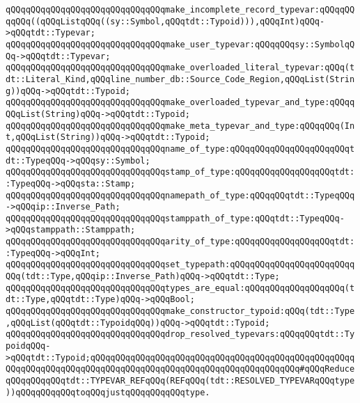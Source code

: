 \verb|qQQqqQQqqQQqqQQqqQQqqQQqqQQqqQQqmake_incomplete_record_typevar:qQQqqQQqqQQq((qQQqListqQQq((sy::Symbol,qQQqtdt::Typoid))),qQQqInt)qQQq->qQQqtdt::Typevar;|\newline
\verb|qQQqqQQqqQQqqQQqqQQqqQQqqQQqqQQqmake_user_typevar:qQQqqQQqsy::SymbolqQQq->qQQqtdt::Typevar;|\newline
\newline
\verb|qQQqqQQqqQQqqQQqqQQqqQQqqQQqqQQqmake_overloaded_literal_typevar:qQQq(tdt::Literal_Kind,qQQqline_number_db::Source_Code_Region,qQQqList(String))qQQq->qQQqtdt::Typoid;|\newline
\verb|qQQqqQQqqQQqqQQqqQQqqQQqqQQqqQQqmake_overloaded_typevar_and_type:qQQqqQQqList(String)qQQq->qQQqtdt::Typoid;|\newline
\newline
\verb|qQQqqQQqqQQqqQQqqQQqqQQqqQQqqQQqmake_meta_typevar_and_type:qQQqqQQq(Int,qQQqList(String))qQQq->qQQqtdt::Typoid;|\newline
\newline
\verb|qQQqqQQqqQQqqQQqqQQqqQQqqQQqqQQqname_of_type:qQQqqQQqqQQqqQQqqQQqqQQqtdt::TypeqQQq->qQQqsy::Symbol;|\newline
\verb|qQQqqQQqqQQqqQQqqQQqqQQqqQQqqQQqstamp_of_type:qQQqqQQqqQQqqQQqqQQqtdt::TypeqQQq->qQQqsta::Stamp;|\newline
\verb|qQQqqQQqqQQqqQQqqQQqqQQqqQQqqQQqnamepath_of_type:qQQqqQQqtdt::TypeqQQq->qQQqip::Inverse_Path;|\newline
\verb|qQQqqQQqqQQqqQQqqQQqqQQqqQQqqQQqstamppath_of_type:qQQqtdt::TypeqQQq->qQQqstamppath::Stamppath;|\newline
\verb|qQQqqQQqqQQqqQQqqQQqqQQqqQQqqQQqarity_of_type:qQQqqQQqqQQqqQQqqQQqtdt::TypeqQQq->qQQqInt;|\newline
\newline
\verb|qQQqqQQqqQQqqQQqqQQqqQQqqQQqqQQqset_typepath:qQQqqQQqqQQqqQQqqQQqqQQqqQQq(tdt::Type,qQQqip::Inverse_Path)qQQq->qQQqtdt::Type;|\newline
\verb|qQQqqQQqqQQqqQQqqQQqqQQqqQQqqQQqtypes_are_equal:qQQqqQQqqQQqqQQqqQQq(tdt::Type,qQQqtdt::Type)qQQq->qQQqBool;|\newline
\verb|qQQqqQQqqQQqqQQqqQQqqQQqqQQqqQQqmake_constructor_typoid:qQQq(tdt::Type,qQQqList(qQQqtdt::TypoidqQQq))qQQq->qQQqtdt::Typoid;|\newline
\newline
\verb|qQQqqQQqqQQqqQQqqQQqqQQqqQQqqQQqdrop_resolved_typevars:qQQqqQQqtdt::TypoidqQQq->qQQqtdt::Typoid;qQQqqQQqqQQqqQQqqQQqqQQqqQQqqQQqqQQqqQQqqQQqqQQqqQQqqQQqqQQqqQQqqQQqqQQqqQQqqQQqqQQqqQQqqQQqqQQqqQQqqQQqqQQqqQQq#qQQqReduceqQQqqQQqqQQqtdt::TYPEVAR_REFqQQq(REFqQQq(tdt::RESOLVED_TYPEVARqQQqtype))qQQqqQQqqQQqtoqQQqjustqQQqqQQqqQQqtype.|\newline
